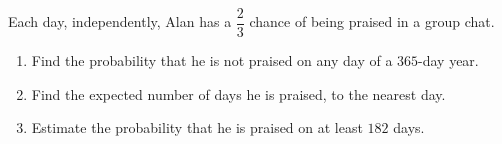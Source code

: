Each day, independently, Alan has a $\dfrac23$ chance of being praised in a group chat.
\begin{enumerate}
\item[(a)] Find the probability that he is not praised on any day of a $365$-day year.
\item[(b)] Find the expected number of days he is praised, to the nearest day.
\item[(c)] Estimate the probability that he is praised on at least $182$ days.
\end{enumerate}
